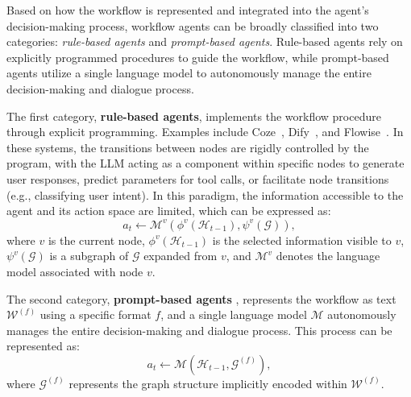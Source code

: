 Based on how the workflow is represented and integrated into the agent's decision-making process, workflow agents can be broadly classified into two categories: \emph{rule-based agents} and \emph{prompt-based agents}. Rule-based agents rely on explicitly programmed procedures to guide the workflow, while prompt-based agents utilize a single language model to autonomously manage the entire decision-making and dialogue process.

The first category, \textbf{rule-based agents}, implements the workflow procedure through explicit programming. Examples include Coze~\citep{coze}, Dify~\citep{dify}, and Flowise~\citep{flowise}. In these systems, the transitions between nodes are rigidly controlled by the program, with the LLM acting as a component within specific nodes to generate user responses, predict parameters for tool calls, or facilitate node transitions (e.g., classifying user intent).  In this paradigm, the information accessible to the agent and its action space are limited, which can be expressed as:
\begin{equation}
    a_t \leftarrow \mathcal{M}^{v}(\phi^{v}(\mathcal{H}_{t-1}), \psi^{v}(\mathcal{G})),
\end{equation}
where $v$ is the current node, $\phi^{v}(\mathcal{H}_{t-1})$ is the selected information visible to $v$, $\psi^{v}(\mathcal{G})$ is a subgraph of $\mathcal{G}$ expanded from $v$, and $\mathcal{M}^{v}$ denotes the language model associated with node $v$. 

The second category, \textbf{prompt-based agents} \citep{FlowBench,KnowAgent}, represents the workflow as text $\mathcal{W}^{(f)}$ using a specific format $f$, and a single language model $\mathcal{M}$ autonomously manages the entire decision-making and dialogue process. This process can be represented as:
\begin{equation}
    a_t \leftarrow \mathcal{M}(\mathcal{H}_{t-1}, \mathcal{G}^{(f)}),
\end{equation}
where $\mathcal{G}^{(f)}$ represents the graph structure implicitly encoded within $\mathcal{W}^{(f)}$. 
